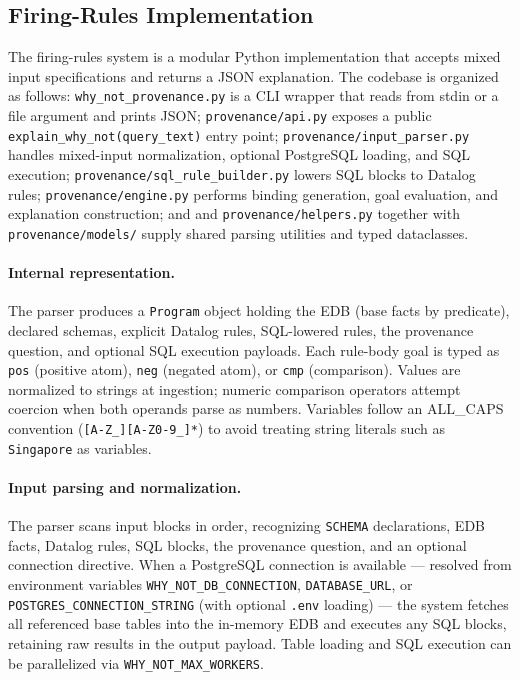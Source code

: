\documentclass{llncs}
\begin{document}
\subsection{Firing-Rules Implementation}
\label{sec:impl-fr}

The firing-rules system is a modular Python implementation that accepts
mixed input specifications and returns a JSON explanation.
The codebase is organized as follows:
\texttt{why\_not\_provenance.py} is a CLI wrapper that reads from stdin
or a file argument and prints JSON;
\texttt{provenance/api.py} exposes a public
\texttt{explain\_why\_not(query\_text)} entry point;
\texttt{provenance/input\_parser.py} handles mixed-input normalization,
optional PostgreSQL loading, and SQL execution;
\texttt{provenance/sql\_rule\_builder.py} lowers SQL blocks to Datalog
rules;
\texttt{provenance/engine.py} performs binding generation, goal
evaluation, and explanation construction; and
and \texttt{provenance/helpers.py} together with
\texttt{provenance/models/} supply shared parsing utilities and
typed dataclasses.

\paragraph{Internal representation.}
The parser produces a \texttt{Program} object holding the EDB (base
facts by predicate), declared schemas, explicit Datalog rules,
SQL-lowered rules, the provenance question, and optional SQL execution
payloads.
Each rule-body goal is typed as \texttt{pos} (positive atom),
\texttt{neg} (negated atom), or \texttt{cmp} (comparison).
Values are normalized to strings at ingestion; numeric comparison
operators attempt coercion when both operands parse as numbers.
Variables follow an ALL\_CAPS convention
(\texttt{[A-Z\_][A-Z0-9\_]*}) to avoid treating string literals such
as \texttt{Singapore} as variables.

\paragraph{Input parsing and normalization.}
The parser scans input blocks in order, recognizing \texttt{SCHEMA}
declarations, EDB facts, Datalog rules, SQL blocks, the provenance
question, and an optional connection directive.
When a PostgreSQL connection is available --- resolved from environment
variables \texttt{WHY\_NOT\_DB\_CONNECTION},
\texttt{DATABASE\_URL}, or
\texttt{POSTGRES\_CONNECTION\_STRING} (with optional \texttt{.env}
loading) --- the system fetches all referenced base tables into the
in-memory EDB and executes any SQL blocks, retaining raw results in the
output payload.
Table loading and SQL execution can be parallelized via
\texttt{WHY\_NOT\_MAX\_WORKERS}.
\end{document}
